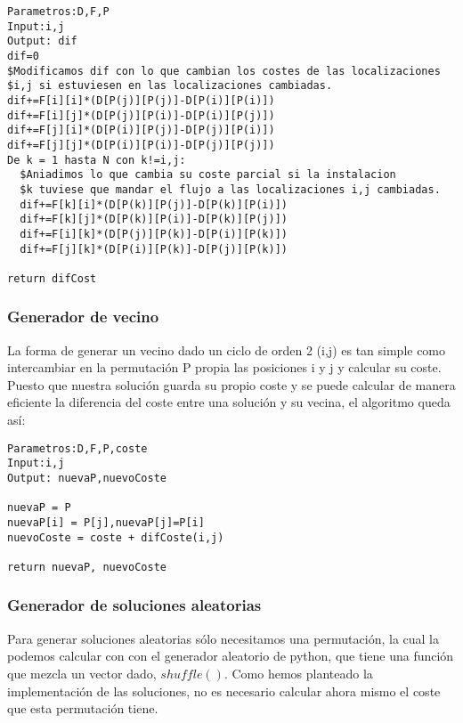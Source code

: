 \begin{lstlisting}
Parametros:D,F,P
Input:i,j
Output: dif
dif=0
$Modificamos dif con lo que cambian los costes de las localizaciones
$i,j si estuviesen en las localizaciones cambiadas.
dif+=F[i][i]*(D[P(j)][P(j)]-D[P(i)][P(i)])
dif+=F[i][j]*(D[P(j)][P(i)]-D[P(i)][P(j)])
dif+=F[j][i]*(D[P(i)][P(j)]-D[P(j)][P(i)])
dif+=F[j][j]*(D[P(i)][P(i)]-D[P(j)][P(j)])
De k = 1 hasta N con k!=i,j:
  $Aniadimos lo que cambia su coste parcial si la instalacion
  $k tuviese que mandar el flujo a las localizaciones i,j cambiadas.
  dif+=F[k][i]*(D[P(k)][P(j)]-D[P(k)][P(i)])
  dif+=F[k][j]*(D[P(k)][P(i)]-D[P(k)][P(j)])
  dif+=F[i][k]*(D[P(j)][P(k)]-D[P(i)][P(k)])
  dif+=F[j][k]*(D[P(i)][P(k)]-D[P(j)][P(k)])
  
return difCost
\end{lstlisting}


\subsubsection{Generador de vecino}
La forma de generar un vecino dado un ciclo de orden 2 (i,j) es tan simple como intercambiar en la permutación P propia las posiciones i y j y calcular su coste. Puesto que nuestra solución guarda su propio coste y se puede calcular de manera eficiente la diferencia del coste entre una solución y su vecina, el algoritmo queda así:\\


\begin{lstlisting}
Parametros:D,F,P,coste
Input:i,j
Output: nuevaP,nuevoCoste

nuevaP = P
nuevaP[i] = P[j],nuevaP[j]=P[i]
nuevoCoste = coste + difCoste(i,j)

return nuevaP, nuevoCoste
\end{lstlisting}




\subsubsection{Generador de soluciones aleatorias}

Para generar soluciones aleatorias sólo necesitamos una permutación, la cual la podemos calcular con con el generador aleatorio de python, que tiene una función que mezcla un vector dado, $shuffle()$. Como hemos planteado la implementación de las soluciones, no es necesario calcular ahora mismo el coste que esta permutación tiene.\\


